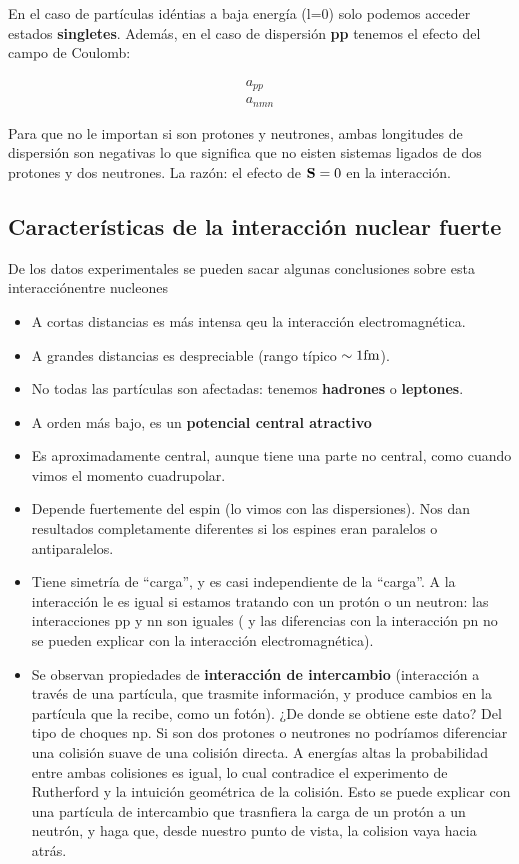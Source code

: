 En el caso de partículas idéntias a baja energía (l=0) solo podemos acceder estados {\bf singletes}. Además, en el caso de dispersión {\bf pp} tenemos el efecto del campo de Coulomb: 

\begin{align}
    a_{pp} \\
    a_{nmn}
\end{align}

Para que no le importan si son protones y neutrones, ambas longitudes de dispersión son negativas lo que significa que no eisten sistemas ligados de dos protones y dos neutrones. La razón: el efecto de $\mathbf{S}=0$ en la interacción.

\subsection{Características de la interacción nuclear fuerte}

De los datos experimentales se pueden sacar algunas conclusiones sobre esta interacciónentre nucleones 

\begin{itemize}
    \item A cortas distancias es más intensa qeu la interacción electromagnética.
    \item A grandes distancias es despreciable (rango típico  $\sim 1 \text{fm}$).
    \item No todas las partículas son afectadas: tenemos \textbf{hadrones} o \textbf{leptones}.
    \item A orden más bajo, es un \textbf{potencial central atractivo}
    \item Es aproximadamente central, aunque tiene una parte no central, como cuando vimos el momento cuadrupolar.
    \item Depende fuertemente del espin (lo vimos con las dispersiones). Nos dan resultados completamente diferentes si los espines eran paralelos o antiparalelos.
    \item Tiene simetría de ``carga'', y es casi independiente de la ``carga''. A la interacción le es igual si estamos tratando con un protón o un neutron: las interacciones pp y nn son iguales ( y las diferencias con la interacción pn no se pueden explicar con la interacción electromagnética). 
    \item Se observan propiedades de \textbf{interacción de intercambio} (interacción a través de una partícula, que trasmite información, y produce cambios en la partícula que la recibe, como un fotón). ¿De donde se obtiene este dato? Del tipo de choques np. Si son dos protones o neutrones no podríamos diferenciar una colisión suave de una colisión directa. A energías altas la probabilidad entre ambas colisiones es igual, lo cual contradice el experimento de Rutherford y la intuición geométrica de la colisión. Esto se puede explicar con una partícula de intercambio que trasnfiera la carga de un protón a un neutrón, y haga que, desde nuestro punto de vista, la colision vaya hacia atrás.    
\end{itemize}

